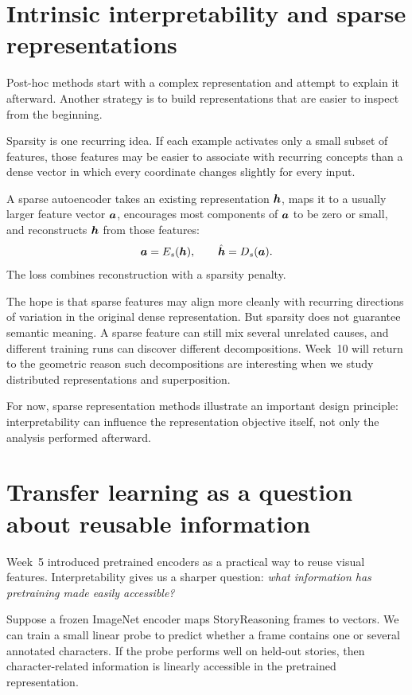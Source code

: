 \section{Intrinsic interpretability and sparse representations}

Post-hoc methods start with a complex representation and attempt to explain it afterward. Another strategy is to build representations that are easier to inspect from the beginning.

Sparsity is one recurring idea. If each example activates only a small subset of features, those features may be easier to associate with recurring concepts than a dense vector in which every coordinate changes slightly for every input.

A sparse autoencoder takes an existing representation \(\bm{h}\), maps it to a usually larger feature vector \(\bm{a}\), encourages most components of \(\bm{a}\) to be zero or small, and reconstructs \(\bm{h}\) from those features:
\[
  \bm{a}=E_s(\bm{h}),
  \qquad
  \hat{\bm{h}}=D_s(\bm{a}).
\]
The loss combines reconstruction with a sparsity penalty.

The hope is that sparse features may align more cleanly with recurring directions of variation in the original dense representation. But sparsity does not guarantee semantic meaning. A sparse feature can still mix several unrelated causes, and different training runs can discover different decompositions. Week~10 will return to the geometric reason such decompositions are interesting when we study distributed representations and superposition.

For now, sparse representation methods illustrate an important design principle: interpretability can influence the representation objective itself, not only the analysis performed afterward.

\section{Transfer learning as a question about reusable information}

Week~5 introduced pretrained encoders as a practical way to reuse visual features. Interpretability gives us a sharper question: \emph{what information has pretraining made easily accessible?}

Suppose a frozen ImageNet encoder maps StoryReasoning frames to vectors. We can train a small linear probe to predict whether a frame contains one or several annotated characters. If the probe performs well on held-out stories, then character-related information is linearly accessible in the pretrained representation.

